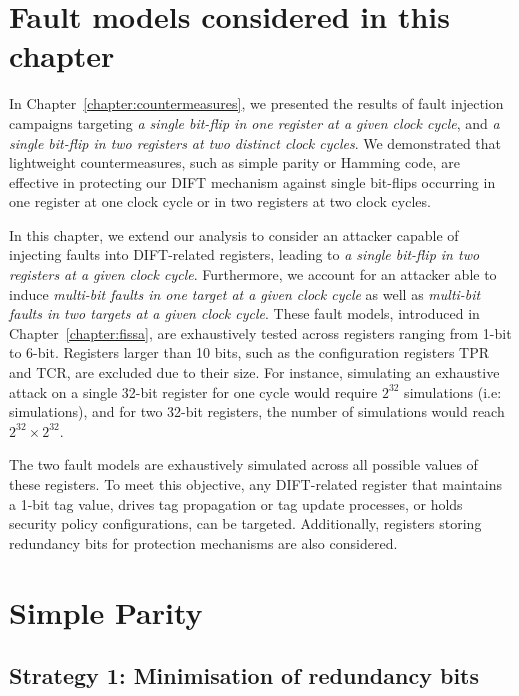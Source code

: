 \section{Fault models considered in this chapter}
\label{section:chap6_faultmodels}
In Chapter~\ref{chapter:countermeasures}, we presented the results of fault injection campaigns targeting \textit{a single bit-flip in one register at a given clock cycle}, and \textit{a single bit-flip in two registers at two distinct clock cycles}. We demonstrated that lightweight countermeasures, such as simple parity or Hamming code, are effective in protecting our DIFT mechanism against single bit-flips occurring in one register at one clock cycle or in two registers at two clock cycles.

In this chapter, we extend our analysis to consider an attacker capable of injecting faults into DIFT-related registers, leading to \textit{a single bit-flip in two registers at a given clock cycle}. Furthermore, we account for an attacker able to induce \textit{multi-bit faults in one target at a given clock cycle} as well as \textit{multi-bit faults in two targets at a given clock cycle}. These fault models, introduced in Chapter~\ref{chapter:fissa}, are exhaustively tested across registers ranging from 1-bit to 6-bit. Registers larger than 10 bits, such as the configuration registers TPR and TCR, are excluded due to their size. For instance, simulating an exhaustive attack on a single 32-bit register for one cycle would require $2^{32}$ simulations (i.e:  simulations), and for two 32-bit registers, the number of simulations would reach $2^{32} \times 2^{32}$.

The two fault models are exhaustively simulated across all possible values of these registers. To meet this objective, any DIFT-related register that maintains a 1-bit tag value, drives tag propagation or tag update processes, or holds security policy configurations, can be targeted. Additionally, registers storing redundancy bits for protection mechanisms are also considered.

\section{Simple Parity}
\label{section:chap6_simple_parity}

\subsection{Strategy 1: Minimisation of redundancy bits}

